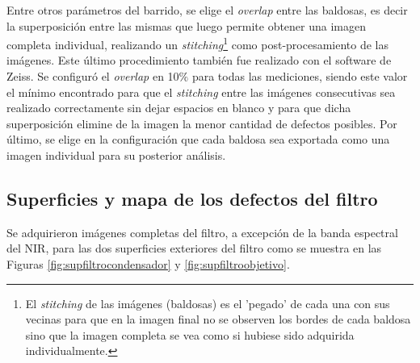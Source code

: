 Entre otros parámetros del barrido, se elige el \textit{overlap} entre las baldosas, es decir la superposición entre las mismas que luego permite obtener una imagen completa individual,  realizando un \textit{stitching}\footnote{El \textit{stitching} de las imágenes (baldosas) es el 'pegado' de cada una con sus vecinas para que en la imagen final no se observen los bordes de cada baldosa sino que la imagen completa se vea como si hubiese sido adquirida individualmente.} como post-procesamiento de las imágenes. Este último procedimiento también fue realizado con el software de Zeiss. Se configuró el \textit{overlap} en 10$\%$ para todas las mediciones, siendo este valor el mínimo encontrado para que el \textit{stitching} entre las imágenes consecutivas sea realizado correctamente sin dejar espacios en blanco y para que dicha superposición elimine de la imagen la menor cantidad de defectos posibles. Por último, se elige en la configuración que cada baldosa sea exportada como una imagen individual para su posterior análisis.

\singlespacing
\subsection*{Superficies y mapa de los defectos del filtro}

\vspace{1.0cm}
\vspace{1.0cm}

\hspace{0.5cm}Se adquirieron imágenes completas del filtro, a excepción de la banda espectral del NIR, para las dos superficies exteriores del filtro como se muestra en las Figuras \ref{fig:supfiltrocondensador} y \ref{fig:supfiltroobjetivo}.

